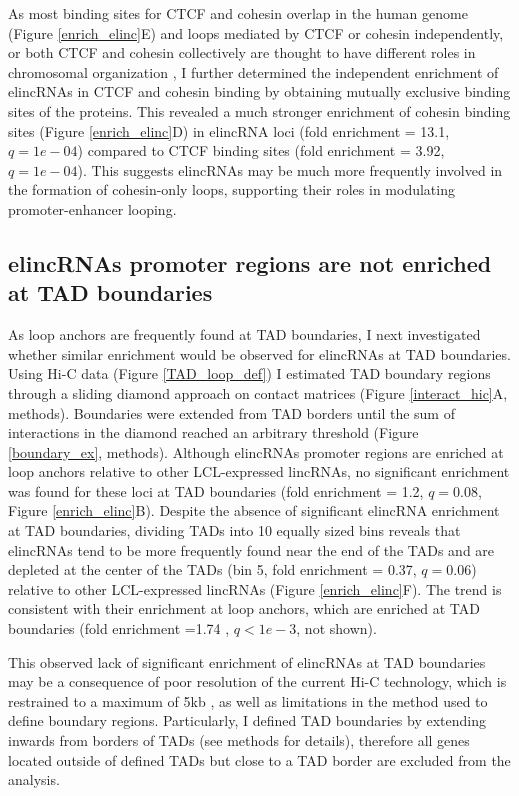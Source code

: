 \documentclass[11pt,a4paper]{report}
\begin{document}
As most binding sites for CTCF and cohesin overlap in the human genome (Figure \ref{enrich_elinc}E) and loops mediated by CTCF or cohesin independently, or both CTCF and cohesin collectively are thought to have different roles in chromosomal organization \cite{Ji2016}⁠, I further determined the independent enrichment of elincRNAs in CTCF and cohesin binding by obtaining mutually exclusive binding sites of the proteins. This revealed a much stronger enrichment of cohesin binding sites (Figure \ref{enrich_elinc}D) in elincRNA loci (fold enrichment = 13.1, $q=1e-04$) compared to CTCF binding sites (fold enrichment = 3.92, $q=1e-04$). This suggests elincRNAs may be much more frequently involved in the formation of cohesin-only loops, supporting their roles in modulating promoter-enhancer looping.

\subsection*{elincRNAs promoter regions are not enriched at TAD boundaries}

As loop anchors are frequently found at TAD boundaries, I next investigated whether similar enrichment would be observed for elincRNAs at TAD boundaries. Using Hi-C data (Figure \ref{TAD_loop_def}) I estimated TAD boundary regions through a sliding diamond approach on contact matrices (Figure \ref{interact_hic}A, methods). Boundaries were extended from TAD borders until the sum of interactions in the diamond reached an arbitrary threshold (Figure \ref{boundary_ex}, methods). Although elincRNAs promoter regions are enriched at loop anchors relative to other LCL-expressed lincRNAs, no significant enrichment was found for these loci  at TAD boundaries (fold enrichment = 1.2, $q=0.08$, Figure \ref{enrich_elinc}B). Despite the absence of significant elincRNA enrichment at TAD boundaries, dividing TADs into 10 equally sized bins reveals that elincRNAs tend to be more frequently found near the end of the TADs and are depleted at the center of the TADs (bin 5, fold enrichment = 0.37, $q=0.06$) relative to other LCL-expressed lincRNAs (Figure \ref{enrich_elinc}F). The trend is consistent with their enrichment at loop anchors, which are enriched at TAD boundaries (fold enrichment =1.74 , $q<1e-3$, not shown).

This observed lack of significant enrichment  of elincRNAs at TAD boundaries may be a consequence of poor resolution of the current Hi-C technology, which is restrained to a maximum of 5kb \cite{Rao2014}⁠, as well as limitations in the method used to define boundary regions. Particularly, I defined TAD boundaries by extending inwards from borders of TADs (see methods for details), therefore all genes located outside of defined TADs but close to a TAD border are excluded from the analysis. 
\end{document}

